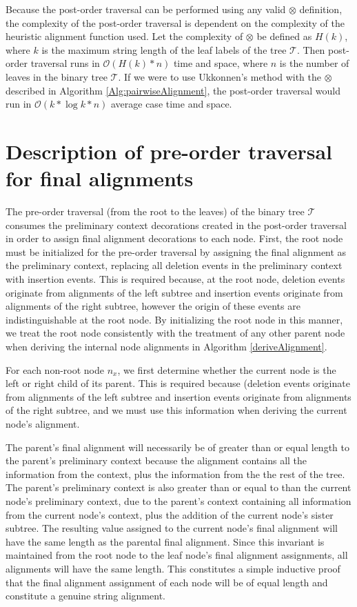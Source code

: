 \documentclass{bmcart}
\begin{document}
Because the post-order traversal can be performed using any valid  $\otimes$ definition, the complexity of the post-order traversal is dependent on the complexity of the heuristic alignment function used.
Let the complexity of $\otimes$ be defined as $H(k)$, where $k$ is the maximum string length of the leaf labels of the tree $\mathcal{T}$.
Then post-order traversal runs in $\mathcal{O}(H(k) * n)$ time and space, where $n$ is the number of leaves in the binary tree $\mathcal{T}$.
If we were to use Ukkonnen's method with the $\otimes$ described in Algorithm \ref{Alg:pairwiseAlignment}, the post-order traversal would run in $\mathcal{O}(k * \log  k * n)$ average case time and space.

\section*{Description of pre-order traversal for final alignments}
The pre-order traversal (from the root to the leaves) of the binary tree $\mathcal{T}$ consumes the preliminary context decorations created in the post-order traversal in order to assign final alignment decorations to each node.
First, the root node must be initialized for the pre-order traversal by assigning the final alignment as the preliminary context, replacing all deletion events in the preliminary context with insertion events.
This is required because, at the root node, deletion events originate from alignments of the left subtree and insertion events originate from alignments of the right subtree, however the origin of these events are indistinguishable at the root node.
By initializing the root node in this manner, we treat the root node consistently with the treatment of any other parent node when deriving the internal node alignments in Algorithm \ref{deriveAlignment}.

For each non-root node $n_x$, we first determine whether the current node is the left or right child of its parent.
This is required because (deletion events originate from alignments of the left subtree and insertion events originate from alignments of the right subtree, and we must use this information when deriving the current node's alignment.

The parent's final alignment will necessarily be of greater than or equal length to the parent's preliminary context because the alignment contains all the information from the context, plus the information from the the rest of the tree.
The parent's preliminary context is also greater than or equal to than the current node's preliminary context, due to the parent's context containing all information from the current node's context, plus the addition of the current node's sister subtree.
The resulting value assigned to the current node's final alignment will have the same length as the parental final alignment.
Since this invariant is maintained from the root node to the leaf node's final alignment assignments, all alignments will have the same length.
This constitutes a simple inductive proof that the final alignment assignment of each node will be of equal length and constitute a genuine string alignment.
\end{document}
